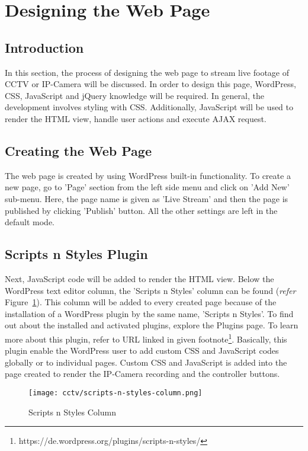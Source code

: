 \section{Designing the Web Page}\label{sec:cctv-designing-the-web-page}
\subsection{Introduction}
In this section, the process of designing the web page to stream live footage of CCTV or IP-Camera will be discussed. In order to design this page, WordPress, CSS, JavaScript and jQuery knowledge will be required. In general, the development involves styling with CSS. Additionally, JavaScript will be used to render the HTML view, handle user actions and execute AJAX request.

\subsection{Creating the Web Page}
The web page is created by using WordPress built-in functionality. To create a new page, go to 'Page' section from the left side menu and click on 'Add New' sub-menu. Here, the page name is given as 'Live Stream' and then the page is published by clicking 'Publish' button. All the other settings are left in the default mode.

\subsection{Scripts n Styles Plugin}
Next, JavaScript code will be added to render the HTML view. Below the WordPress text editor column, the 'Scripts n Styles' column can be found (\emph{refer} Figure~\ref{fig:scripts-n-styles-column}). This column will be added to every created page because of the installation of a WordPress plugin by the same name, 'Scripts n Styles'. To find out about the installed and activated plugins, explore the Plugins page. To learn more about this plugin, refer to URL linked in given footnote\footnote{https://de.wordpress.org/plugins/scripts-n-styles/}. Basically, this plugin enable the WordPress user to add custom CSS and JavaScript codes globally or to individual pages. Custom CSS and JavaScript is added into the page created to render the IP-Camera recording and the controller buttons.

\begin{figure}[h]
\caption{Scripts n Styles Column}
\label{fig:scripts-n-styles-column}
\centering
\texttt{[image: cctv/scripts-n-styles-column.png]}
\end{figure}

